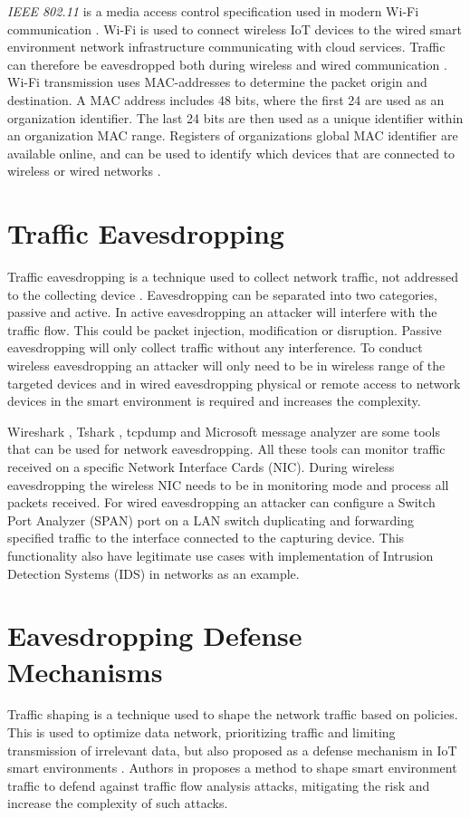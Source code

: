 \textit{IEEE 802.11} is a media access control specification used in modern Wi-Fi communication \cite{wifi_ieee80211}. Wi-Fi is used to connect wireless IoT devices to the wired smart environment network infrastructure communicating with cloud services. Traffic can therefore be eavesdropped both during wireless and wired communication \cite{eavesdroppingwifi}. Wi-Fi transmission uses MAC-addresses \cite{macaddress} to determine the packet origin and destination. A MAC address includes 48 bits, where the first 24 are used as an organization identifier. The last 24 bits are then used as a unique identifier within an organization MAC range. Registers of organizations global MAC identifier are available online, and can be used to identify which devices that are connected to wireless or wired networks \cite{mac_address_lookup}. 

\section{Traffic Eavesdropping}
Traffic eavesdropping is a technique used to collect network traffic, not addressed to the collecting device \cite{eavsdropping_fortinet}. Eavesdropping can be separated into two categories, passive and active. In active eavesdropping an attacker will interfere with the traffic flow. This could be packet injection, modification or disruption. Passive eavesdropping will only collect traffic without any interference. To conduct wireless eavesdropping an attacker will only need to be in wireless range of the targeted devices \cite{eavesdroppingwifi} and in wired eavesdropping physical or remote access to network devices in the smart environment is required and increases the complexity. 

Wireshark \cite{wireshark}, Tshark \cite{tshark_filter}, tcpdump \cite{tcpdump} and Microsoft message analyzer \cite{microsoftmessageanalyzer} are some tools that can be used for network eavesdropping. All these tools can monitor traffic received on a specific Network Interface Cards (NIC). During wireless eavesdropping the wireless NIC needs to be in monitoring mode and process all packets received. For wired eavesdropping an attacker can configure a Switch Port Analyzer (SPAN) port on a LAN switch duplicating and forwarding specified traffic to the interface connected to the capturing device. This functionality also have legitimate use cases with implementation of Intrusion Detection Systems (IDS) in networks as an example. 

\section{Eavesdropping Defense Mechanisms}
Traffic shaping is a technique used to shape the network traffic based on policies. This is used to optimize data network, prioritizing traffic and limiting transmission of irrelevant data, but also proposed as a defense mechanism in IoT smart environments \cite{traffic_shaping_saeed2017carousel}. Authors in \cite{traffic_shaping_xiong2022network} proposes a method to shape smart environment traffic to defend against traffic flow analysis attacks, mitigating the risk and increase the complexity of such attacks. 

